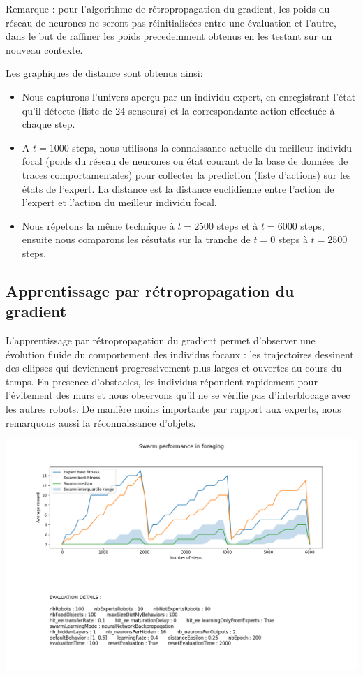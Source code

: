 \documentclass[a4paper, 12pt]{report}
\begin{document}
    Remarque : pour l'algorithme de rétropropagation du gradient, les poids du réseau de neurones ne seront pas réinitialisées entre une évaluation et l'autre, dans le but de raffiner les poids precedemment obtenus en les testant sur un nouveau contexte.
    
    Les graphiques de distance sont obtenus ainsi:
    \begin{itemize}
        \item Nous capturons l'univers aperçu par un individu expert, en enregistrant l'état qu'il détecte (liste de 24 senseurs) et la correspondante action effectuée à chaque step.
        \item A $t = 1000$ steps, nous utilisons la connaissance actuelle du meilleur individu focal (poids du réseau de neurones ou état courant de la base de données de traces comportamentales) pour collecter la prediction (liste d'actions) sur les états de l'expert. La distance est la distance euclidienne entre l'action de l'expert et l'action du meilleur individu focal.
        \item Nous répetons la même technique à $t = 2500$ steps et à $t = 6000$ steps, ensuite nous comparons les résutats sur la tranche de $t = 0$ steps à $t = 2500$ steps.
    \end{itemize}


	
	
    \subsection{Apprentissage par rétropropagation du gradient}
    L'apprentissage par rétropropagation du gradient permet d'observer une évolution fluide du comportement des individus focaux : les trajectoires dessinent des ellipses qui deviennent progressivement plus larges et ouvertes au cours du temps. En presence d'obstacles, les individus répondent rapidement pour l'évitement des murs et nous observons qu'il ne se vérifie pas d'interblocage avec les autres robots. De manière moins importante par rapport aux experts, nous remarquons aussi la réconnaissance d'objets.
    
    \includegraphics[scale=0.5]{bp6000_100.png}
    
\end{document}
